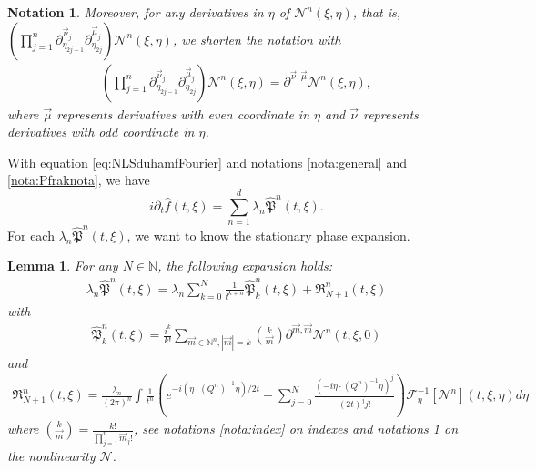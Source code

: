 \documentclass[a4paper, 15pt]{article}
\numberwithin{equation}{section}
\newtheorem{lem}[defi]{Lemma}
\newtheorem{nota}[defi]{Notation}
\begin{document}
\begin{nota}
\label{nota:Nonlinearitybis}
Moreover, for any derivatives in $\eta$ of $\mathcal{N}^n(\xi,\eta)$, that is, $(\prod_{j=1}^n\partial^{\overrightarrow{\nu}_j}_{\eta_{2j-1}}\partial^{\overrightarrow{\mu}_j}_{\eta_{2j}})\mathcal{N}^n(\xi,\eta)$, we shorten the notation with 
\begin{align}
    (\prod_{j=1}^n\partial^{\overrightarrow{\nu}_j}_{\eta_{2j-1}}\partial^{\overrightarrow{\mu}_j}_{\eta_{2j}})\mathcal{N}^n(\xi,\eta)=\partial^{\overrightarrow{\nu},\overrightarrow{\mu}}\mathcal{N}^n(\xi,\eta),
\end{align}
where $\overrightarrow{\mu}$ represents derivatives with even coordinate in $\eta$ and  $\overrightarrow{\nu}$ represents derivatives with odd coordinate in $\eta$.
\end{nota}
With equation \eqref{eq:NLSduhamfFourier} and notations \ref{nota:general} and \ref{nota:Pfraknota}, we have 
\begin{equation}
    i\partial_t\hat{f}(t,\xi)=\sum_{n=1}^{d}\lambda_n\hat{\mathfrak{P}}^n(t,\xi).
\end{equation}
For each $\lambda_n\hat{\mathfrak{P}}^n(t,\xi)$, we want to know the stationary phase expansion. \\
\begin{lem}
\label{lem:exactformP}
For any $N\in\mathbb{N}$, the following expansion holds:
\begin{align}
\lambda_n\hat{\mathfrak{P}}^n(t,\xi)=\lambda_n\sum_{k=0}^{N}\frac{1}{t^{k+n}}\hat{\mathfrak{P}}^n_k(t,\xi)+\mathfrak{R}^n_{N+1}(t,\xi)
\end{align}
with 
\begin{align}
\hat{\mathfrak{P}}^n_k(t,\xi)=\frac{i^k}{k!}\sum_{\overrightarrow{m}\in\mathbb{N}^n,|\overrightarrow{m}|=k}\binom{k}{\overrightarrow{m}}
\partial^{\overrightarrow{m},\overrightarrow{m}}\mathcal{N}^n(t,\xi,0)
\end{align}
and 
\begin{align}
\mathfrak{R}^n_{N+1}(t,\xi)=\frac{\lambda_n}{(2\pi)^n}\int\frac{1}{t^n}(e^{-i(\eta\cdot  (Q^n)^{-1}\eta)/2t}-\sum^{N}_{j=0}\frac{(-i\eta\cdot (Q^n)^{-1}\eta)^j}{(2t)^{j}j!})\mathcal{F}^{-1}_{\eta}[\mathcal{N}^n](t,\xi,\eta)d\eta
\end{align}
where $\binom{k}{\overrightarrow{m}}=\frac{k!}{\prod_{j=1}^n\overrightarrow{m}_j!}$, see notations \ref{nota:index} on indexes and notations \ref{nota:Nonlinearitybis} on the nonlinearity $\mathcal{N}$.
\end{lem}
\end{document}
